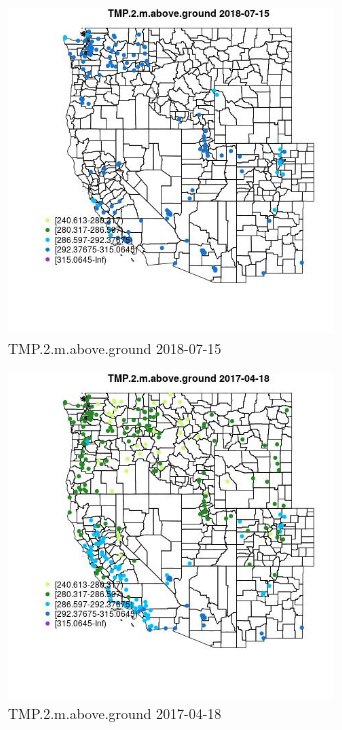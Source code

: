 \begin{figure} 
\centering  
\includegraphics[width=0.77\textwidth]{Code_Outputs/Report_ML_input_PM25_Step4_part_e_de_duplicated_aves_compiled_2019-05-21wNAs_MapObsTMP2maboveground2018-07-15.jpg} 
\caption{\label{fig:Report_ML_input_PM25_Step4_part_e_de_duplicated_aves_compiled_2019-05-21wNAsMapObsTMP2maboveground2018-07-15}TMP.2.m.above.ground 2018-07-15} 
\end{figure} 
 

\begin{figure} 
\centering  
\includegraphics[width=0.77\textwidth]{Code_Outputs/Report_ML_input_PM25_Step4_part_e_de_duplicated_aves_compiled_2019-05-21wNAs_MapObsTMP2maboveground2017-04-18.jpg} 
\caption{\label{fig:Report_ML_input_PM25_Step4_part_e_de_duplicated_aves_compiled_2019-05-21wNAsMapObsTMP2maboveground2017-04-18}TMP.2.m.above.ground 2017-04-18} 
\end{figure} 
 

